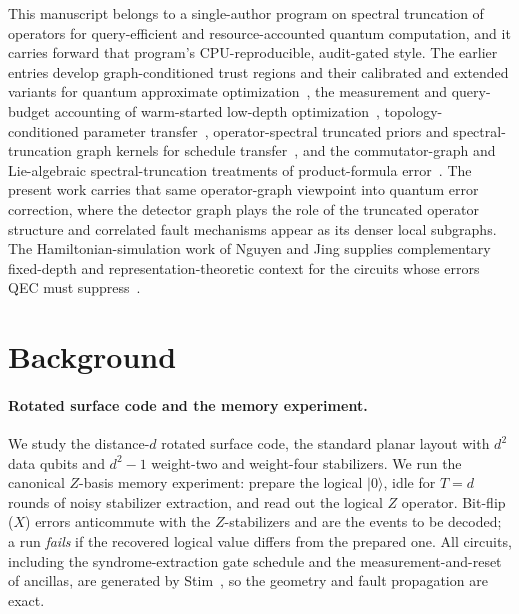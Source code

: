 \documentclass[aps,prxquantum,twocolumn,superscriptaddress,nofootinbib,longbibliography]{revtex4-2}
\begin{document}
This manuscript belongs to a single-author program on spectral truncation of
operators for query-efficient and resource-accounted quantum computation, and it
carries forward that program's CPU-reproducible, audit-gated style. The earlier
entries develop graph-conditioned trust regions and their calibrated and extended
variants for quantum approximate optimization~\cite{huynh2026gctr,huynh2026gctrcalpro},
the measurement and query-budget accounting of warm-started low-depth
optimization~\cite{huynh2026meascost,huynh2026certqb}, topology-conditioned
parameter transfer~\cite{huynh2026paramxferB},
operator-spectral truncated priors and spectral-truncation graph kernels for
schedule transfer~\cite{huynh2026ostqaoa,huynh2026topoqaoa}, and the
commutator-graph and Lie-algebraic spectral-truncation treatments of
product-formula error~\cite{huynh2026topoham,huynh2026lie}. The present work
carries that same operator-graph viewpoint into quantum error correction, where the
detector graph plays the role of the truncated operator structure and correlated
fault mechanisms appear as its denser local subgraphs. The Hamiltonian-simulation
work of Nguyen and Jing supplies complementary fixed-depth and
representation-theoretic context for the circuits whose errors QEC must
suppress~\cite{nguyen2025zassenhaus,jing2026complexity}.

\section{Background}
\label{sec:background}

\paragraph{Rotated surface code and the memory experiment.}
We study the distance-$d$ rotated surface code, the standard planar layout with
$d^2$ data qubits and $d^2-1$ weight-two and weight-four stabilizers. We run the
canonical $Z$-basis memory experiment: prepare the logical $|0\rangle$, idle for
$T=d$ rounds of noisy stabilizer extraction, and read out the logical $Z$
operator. Bit-flip ($X$) errors anticommute with the $Z$-stabilizers and are the
events to be decoded; a run \emph{fails} if the recovered logical value differs
from the prepared one. All circuits, including the syndrome-extraction gate
schedule and the measurement-and-reset of ancillas, are generated by
Stim~\cite{gidney2021stim}, so the geometry and fault propagation are exact.
\end{document}
